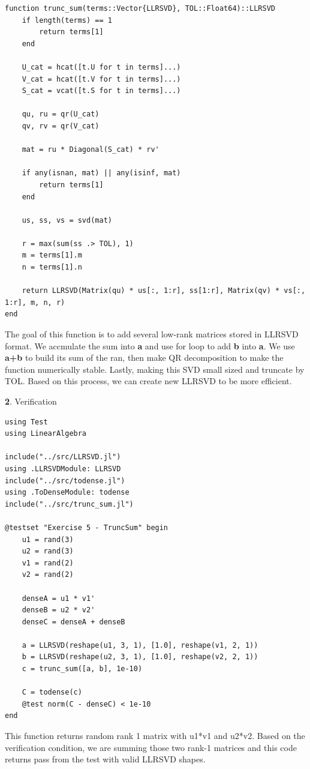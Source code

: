 \documentclass[11pt]{article}
\begin{document}
\begin{lstlisting}
function trunc_sum(terms::Vector{LLRSVD}, TOL::Float64)::LLRSVD
    if length(terms) == 1
        return terms[1]
    end

    U_cat = hcat([t.U for t in terms]...)
    V_cat = hcat([t.V for t in terms]...)
    S_cat = vcat([t.S for t in terms]...)

    qu, ru = qr(U_cat)
    qv, rv = qr(V_cat)

    mat = ru * Diagonal(S_cat) * rv'

    if any(isnan, mat) || any(isinf, mat)
        return terms[1]
    end

    us, ss, vs = svd(mat)

    r = max(sum(ss .> TOL), 1)
    m = terms[1].m
    n = terms[1].n

    return LLRSVD(Matrix(qu) * us[:, 1:r], ss[1:r], Matrix(qv) * vs[:, 1:r], m, n, r)
end
\end{lstlisting}

The goal of this function is to add several low-rank matrices stored in LLRSVD format. We accmulate the sum into \textbf{a} and use for loop to add \textbf{b} into \textbf{a}. We use \textbf{a+b}  to build its sum of the ran, then make QR decomposition to make the function numerically stable. Lastly, making this SVD small sized and truncate by TOL. Based on this process, we can create new LLRSVD to be more efficient.  

\vspace{1.5em}

\textbf{2}. Verification

\begin{lstlisting}
using Test
using LinearAlgebra

include("../src/LLRSVD.jl")
using .LLRSVDModule: LLRSVD
include("../src/todense.jl")
using .ToDenseModule: todense
include("../src/trunc_sum.jl")

@testset "Exercise 5 - TruncSum" begin
    u1 = rand(3)
    u2 = rand(3)
    v1 = rand(2)
    v2 = rand(2)
    
    denseA = u1 * v1'
    denseB = u2 * v2'
    denseC = denseA + denseB

    a = LLRSVD(reshape(u1, 3, 1), [1.0], reshape(v1, 2, 1))
    b = LLRSVD(reshape(u2, 3, 1), [1.0], reshape(v2, 2, 1))
    c = trunc_sum([a, b], 1e-10)

    C = todense(c)
    @test norm(C - denseC) < 1e-10
end
\end{lstlisting}

This function returns random rank 1 matrix with u1*v1 and u2*v2. Based on the verification condition, we are summing those two rank-1 matrices and this code returns pass from the test with valid LLRSVD shapes.
\end{document}
